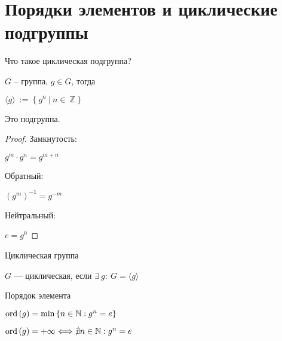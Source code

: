 \section{Порядки элементов и циклические подгруппы}
Что такое циклическая подгруппа?

$G$ -- группа, $g\in G$, тогда

$\langle g \rangle\ :=\ \{\ g^n\ |\ n\in\ \mathbb{Z}\ \}$

\begin{theorem-non}
Это подгруппа.

\begin{proof}
Замкнутость: 

$g^m\cdot g^n = g^{m+n}$

Обратный: 

$(g^m)^{-1} = g^{-m}$

Нейтральный: 

$e = g^0$

\end{proof}
\end{theorem-non}

\begin{conj} Циклическая группа

$G$ --- циклическая, если $\exists\ g:\ G = \langle g \rangle$
\end{conj}

\begin{conj} Порядок элемента

  $\operatorname{ord}\left( g \right) = \min{ \{ n\in \mathbb{N} : g^n = e \} }$

  $\operatorname{ord}\left( g \right) = +\infty \Longleftrightarrow \nexists n\in \mathbb{N} : g^n = e$
\end{conj}

